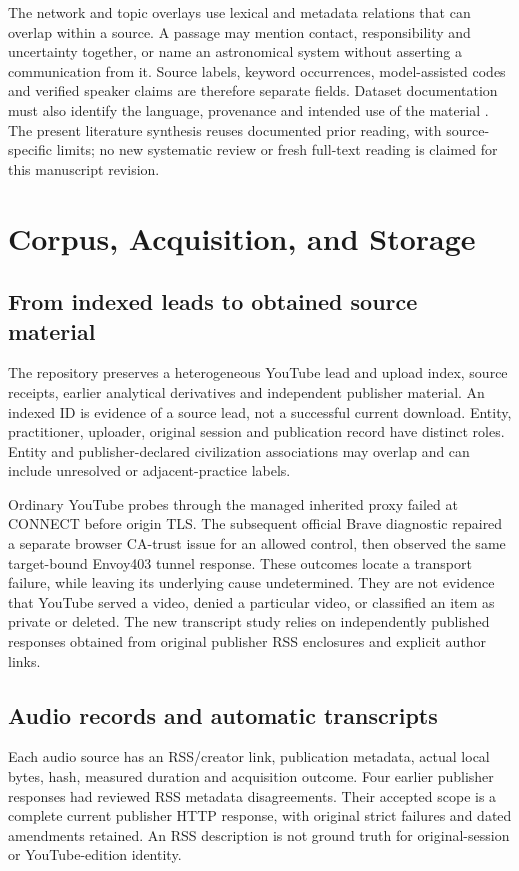 The network and topic overlays use lexical and metadata relations that can overlap within a source. A passage may mention contact, responsibility and uncertainty together, or name an astronomical system without asserting a communication from it. Source labels, keyword occurrences, model-assisted codes and verified speaker claims are therefore separate fields. Dataset documentation must also identify the language, provenance and intended use of the material \citep{bender2018statements,olteanu2019social}. The present literature synthesis reuses documented prior reading, with source-specific limits; no new systematic review or fresh full-text reading is claimed for this manuscript revision.

\section{Corpus, Acquisition, and Storage}
\subsection{From indexed leads to obtained source material}
The repository preserves a heterogeneous YouTube lead and upload index, source receipts, earlier analytical derivatives and independent publisher material. An indexed ID is evidence of a source lead, not a successful current download. Entity, practitioner, uploader, original session and publication record have distinct roles. Entity and publisher-declared civilization associations may overlap and can include unresolved or adjacent-practice labels.

Ordinary YouTube probes through the managed inherited proxy failed at CONNECT before origin TLS. The subsequent official Brave diagnostic repaired a separate browser CA-trust issue for an allowed control, then observed the same target-bound Envoy403 tunnel response. These outcomes locate a transport failure, while leaving its underlying cause undetermined. They are not evidence that YouTube served a video, denied a particular video, or classified an item as private or deleted. The new transcript study relies on independently published responses obtained from original publisher RSS enclosures and explicit author links.



\subsection{Audio records and automatic transcripts}
Each audio source has an RSS/creator link, publication metadata, actual local bytes, hash, measured duration and acquisition outcome. Four earlier publisher responses had reviewed RSS metadata disagreements. Their accepted scope is a complete current publisher HTTP response, with original strict failures and dated amendments retained. An RSS description is not ground truth for original-session or YouTube-edition identity.

